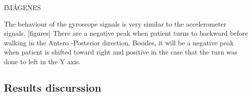 IMÁGENES

The behaviour of the gyroscope signals is very similar to the accelerometer signals. [figures]
There are a negative peak when patient turns to backward before walking in the Antero -Posterior direction. Besides, it will be a negative peak when patient is shifted toward right and positive in the case that the turn was done to left in the Y axis.



\subsection{Results discurssion}
